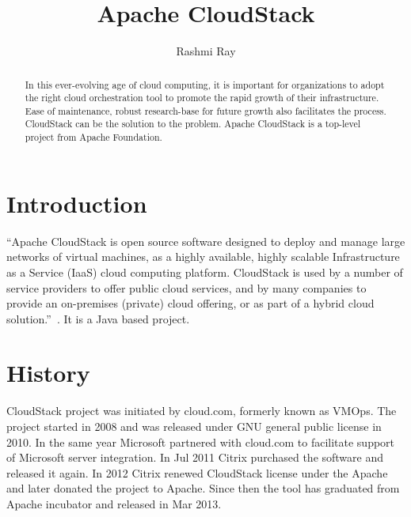 
\title{Apache CloudStack}


\author{Rashmi Ray}


\renewcommand{\shortauthors}{G. v. Laszewski}


\begin{abstract}

  In this ever-evolving age of cloud computing, it is important for
  organizations to adopt the right cloud orchestration tool to promote
  the rapid growth of their infrastructure. Ease of maintenance, 
  robust research-base for future growth
  also facilitates the process. CloudStack can be the solution to 
  the problem. Apache CloudStack is a top-level project from Apache Foundation.

\end{abstract}


\maketitle

\section{Introduction}

``Apache CloudStack is open source software designed to deploy and
manage large networks of virtual machines, as a highly available,
highly scalable Infrastructure as a Service (IaaS) cloud computing
platform. CloudStack is used by a number of service providers to offer
public cloud services, and by many companies to provide an on-premises
(private) cloud offering, or as part of a hybrid cloud
solution.''~\cite{hid-sp18-417-www-cloudstack-intro}. It is a Java based project.


\section{History}

CloudStack project was initiated by cloud.com, formerly known as
VMOps.  The project started in 2008 and was released under GNU general
public license in 2010.  In the same year Microsoft partnered with cloud.com to 
facilitate support of Microsoft server integration. 
In Jul 2011 Citrix purchased the software and
released it again. In 2012 Citrix renewed CloudStack license under
the Apache and later donated the project to Apache.  Since then the
tool has graduated from Apache incubator and released in Mar 2013.


